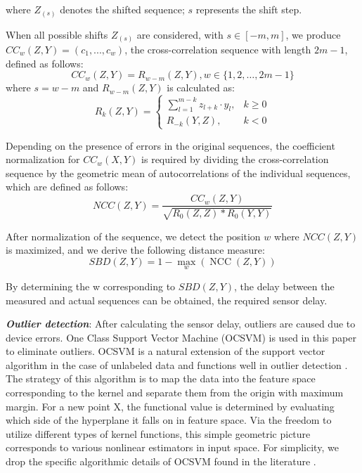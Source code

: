 \documentclass[a4paper]{cas-sc}
\begin{document}
where $Z_{(s)}$ denotes the shifted sequence; $s$ represents the shift step.

When all possible shifts $Z_{(s)}$ are considered, with $s\in[-m, m]$, we produce $CC_w(Z,Y)= (c_1,..., c_w)$, the cross-correlation sequence with length $2m-1$, defined as follows:
\begin{equation}
  C C_{w}(Z, Y)=R_{w-m}(Z, Y), w \in\{1,2, \ldots, 2 m-1\}
  \label{Eq6}
\end{equation}
where $s=w-m$ and $R_{w-m}\left(Z,Y\right)$ is calculated as:
\begin{equation}
  R_{k}(Z, Y)= \begin{cases}\sum_{l=1}^{m-k} z_{l+k} \cdot y_{l}, & k \geq 0 \\ R_{-k}(Y, Z), & k<0\end{cases}
  \label{Eq7}
\end{equation}

Depending on the presence of errors in the original sequences, the coefficient normalization for $CC_w(X,Y)$ is required by dividing the cross-correlation sequence by the geometric mean of autocorrelations of the individual sequences, which are defined as follows:
\begin{equation}
  NCC(Z,Y)=\frac{CC_w(Z,Y)}{\sqrt{R_0\left(Z,Z\right)\ast R_0(Y,Y)}}
  \label{Eq8}
\end{equation}

After normalization of the sequence, we detect the position $w$ where $NCC(Z,Y)$ is maximized, and we derive the following distance measure:
\begin{equation}
  SBD(Z,Y)=1-\max _{w}\left(\operatorname{NCC}(Z, Y)\right)
  \label{Eq9}
\end{equation}

By determining the w corresponding to $SBD(Z, Y)$, the delay between the measured and actual sequences can be obtained, the required sensor delay.


\textbf{\emph{Outlier detection}}: After calculating the sensor delay, outliers are caused due to device errors. One Class Support Vector Machine (OCSVM) is used in this paper to eliminate outliers. OCSVM is a natural extension of the support vector algorithm in the case of unlabeled data and functions well in outlier detection \citep{Scholkopf1999}. The strategy of this algorithm is to map the data into the feature space corresponding to the kernel and separate them from the origin with maximum margin. For a new point X, the functional value is determined by evaluating which side of the hyperplane it falls on in feature space. Via the freedom to utilize different types of kernel functions, this simple geometric picture corresponds to various nonlinear estimators in input space. For simplicity, we drop the specific algorithmic details of OCSVM found in the literature \citep{Scholkopf2001,Scholkopf2002}.
\end{document}

